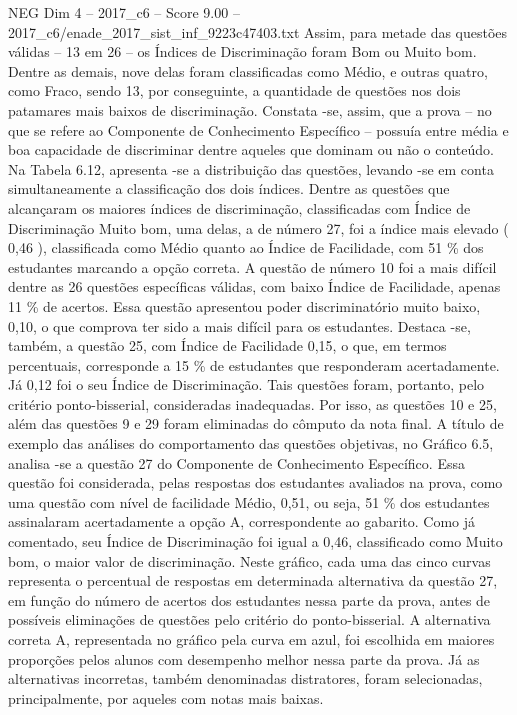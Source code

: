 \begin{textsample}{NEG Dim 4 – 2017\_c6 – Score 9.00 – 2017\_c6/enade\_2017\_sist\_inf\_9223c47403.txt}
Assim, para metade das questões válidas – 13 em 26 – os Índices de Discriminação foram Bom ou Muito bom.
Dentre as demais, nove delas foram classificadas como Médio, e outras quatro, como Fraco, sendo 13, por conseguinte, a quantidade de questões nos dois patamares mais baixos de discriminação.
Constata -se, assim, que a prova – no que se refere ao Componente de Conhecimento Específico – possuía entre média e boa capacidade de discriminar dentre aqueles que dominam ou não o conteúdo.
Na Tabela 6.12, apresenta -se a distribuição das questões, levando -se em conta simultaneamente a classificação dos dois índices.
Dentre as questões que alcançaram os maiores índices de discriminação, classificadas com Índice de Discriminação Muito bom, uma delas, a de número 27, foi a índice mais elevado ( 0,46 ), classificada como Médio quanto ao Índice de Facilidade, com 51 \% dos estudantes marcando a opção correta.
A questão de número 10 foi a mais difícil dentre as 26 questões específicas válidas, com baixo Índice de Facilidade, apenas 11 \% de acertos.
Essa questão apresentou poder discriminatório muito baixo, 0,10, o que comprova ter sido a mais difícil para os estudantes.
Destaca -se, também, a questão 25, com Índice de Facilidade 0,15, o que, em termos percentuais, corresponde a 15 \% de estudantes que responderam acertadamente.
Já 0,12 foi o seu Índice de Discriminação.
Tais questões foram, portanto, pelo critério ponto-bisserial, consideradas inadequadas.
Por isso, as questões 10 e 25, além das questões 9 e 29 foram eliminadas do cômputo da nota final.
A título de exemplo das análises do comportamento das questões objetivas, no Gráfico 6.5, analisa -se a questão 27 do Componente de Conhecimento Específico.
Essa questão foi considerada, pelas respostas dos estudantes avaliados na prova, como uma questão com nível de facilidade Médio, 0,51, ou seja, 51 \% dos estudantes assinalaram acertadamente a opção A, correspondente ao gabarito.
Como já comentado, seu Índice de Discriminação foi igual a 0,46, classificado como Muito bom, o maior valor de discriminação.
Neste gráfico, cada uma das cinco curvas representa o percentual de respostas em determinada alternativa da questão 27, em função do número de acertos dos estudantes nessa parte da prova, antes de possíveis eliminações de questões pelo critério do ponto-bisserial.
A alternativa correta A, representada no gráfico pela curva em azul, foi escolhida em maiores proporções pelos alunos com desempenho melhor nessa parte da prova.
Já as alternativas incorretas, também denominadas distratores, foram selecionadas, principalmente, por aqueles com notas mais baixas.

\end{textsample}
